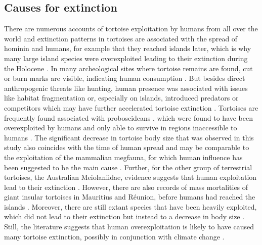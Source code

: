 \subsection{Causes for extinction}
There are numerous accounts of tortoise exploitation by humans from all over the world \citep{Blasco2008,Blasco2011,Blasco2016,Pritchard2013,Speth2002,Thompson2014,Steadman2017,Franz2001,Avery2004,Karl2012,Archer2014,Mudar2007,Munro2010,Peres2006,Sampson1998,Sampson2000} and extinction patterns in tortoises are associated with the spread of hominin and humans, for example that they reached islands later, which is why many large island species were overexploited leading to their extinction during the Holocene \citep{Rhodin2015}. 
In many archeological sites where tortoise remains are found, cut or burn marks are visible, indicating human consumption \citep{.}. But besides direct anthropogenic threats like hunting, human presence was associated with issues like habitat fragmentation or, especially on islands, introduced predators or competitors which may have further accelerated tortoise extinction \citep{.}. 
Tortoises are frequently found associated with proboscideans \citep{Hooijer1951,Vlachos2014}, which were found to have been overexploited by humans and only able to survive in regions inaccessible to humans \citep{Surovell2005}.
The significant decrease in tortoise body size that was observed in this study also coincides with the time of human spread and may be comparable to the exploitation of the mammalian megfauna, for which human influence has been suggested to be the main cause \citep{Barnosky2004, Sandom2014}.
Further, for the other group of terrestrial tortoises, the Australian Meiolaniidae, evidence suggests that human exploitation lead to their extinction \citep{White2010}.
However, there are also records of mass mortalities of giant insular tortoises in Mauritius and Réunion, before humans had reached the islands \citep{Cheke2016}. Moreover, there are still extant species that have been heavily exploited, which did not lead to their extinction but instead to a decrease in body size \citep{Stiner1999,Steele2005}.
Still, the literature suggests that human overexploitation is likely to have caused many tortoise extinction, possibly in conjunction with climate change \citep{Cione2003}.



